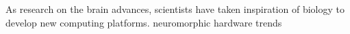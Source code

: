 As research on the brain advances, scientists have taken inspiration of biology to develop new computing platforms.
neuromorphic hardware trends